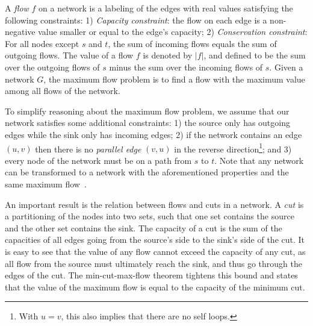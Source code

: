 \documentclass[smallcondensed]{svjour3}     %
\begin{document}
A \emph{flow} $f$ on a network is a labeling of the edges with real values satisfying the following constraints: 1) \emph{Capacity constraint}: the flow on each edge is a non-negative value smaller or equal to the edge's capacity; 2) \emph{Conservation constraint}: For all nodes except $s$ and $t$, the sum of incoming flows equals the 
sum of outgoing flows.
% 
The value of a flow $f$ is denoted by $|f|$, and defined to be the sum over the outgoing flows of $s$ minus the sum over the incoming flows of $s$.
Given a network $G$, the maximum flow problem is to find a flow with the maximum value among all flows of the network. 

To simplify reasoning about the maximum flow problem, we assume that our network satisfies some additional constraints: 1) the source only has outgoing edges while the sink only has incoming edges; 2) if the network contains an edge $(u, v)$ then there is no \emph{parallel edge} $(v, u)$ in the reverse direction\footnote{With $u=v$, this also implies that there are no self loops.}; and 3) every node of the network must be on a path from $s$ to $t$. Note that any network can be transformed to a network with the aforementioned properties and the same maximum flow~\cite{CLRS09}.


An important result is the relation between flows and cuts in a network. A \emph{cut} is a partitioning of the nodes into two sets, such that one set contains 
the source and the other set contains the sink. The capacity of a cut is the sum of the capacities of all edges going from the source's side to the sink's side of the cut.
It is easy to see that the value of any flow cannot exceed the capacity of any cut, as all flow from the source must ultimately reach the sink, and thus go through the edges of the cut. The min-cut-max-flow theorem tightens this bound and states that the value of the maximum flow is equal to the capacity of the minimum cut.
\end{document}
